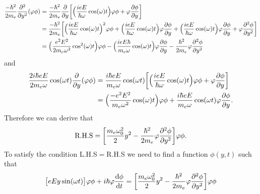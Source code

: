 \documentclass[a4paper]{article}
\numberwithin{equation}{subsection}
\numberwithin{equation}{section}
\begin{document}
\begin{equation} \label{1.25}
  \begin{aligned}
    \frac{-\hbar^2}{2m_e}\pdv[2]{y}(\varphi\phi) & =
    \frac{-\hbar^2}{2m_e} \pdv{y}\bigg[
      \Big(\frac{ieE}{\hbar \omega} \cos(\omega)t\Big)\varphi\phi +
      \varphi\pdv{\phi}{y}
    \bigg] \\
    & =
    \frac{-\hbar^2}{2m_e} \bigg[
      \Big(\frac{ieE}{\hbar \omega} \cos(\omega)t\Big)^2\varphi\phi +
      \Big(\frac{ieE}{\hbar \omega} \cos(\omega)t\Big)\varphi\pdv{\phi}{y} +
      \Big(\frac{ieE}{\hbar \omega} \cos(\omega)t\Big)\varphi\pdv{\phi}{y} +
      \varphi\pdv[2]{\phi}{y}
    \bigg] \\
    & =
    \Big(\frac{e^2E^2}{ 2m_e\omega^2} \cos[2](\omega)t\Big)\varphi\phi -
    \Big(\frac{ieE \hbar}{m_e\omega} \cos(\omega)t\Big)\varphi\pdv{\phi}{y} -
    \frac{\hbar^2}{2m_e}
    \varphi\pdv[2]{\phi}{y}
  \end{aligned}
\end{equation}
and
\begin{equation} \label{1.26}
  \begin{aligned}
    \frac{2i\hbar eE}{2m_e\omega}\cos(\omega t) \pdv{y} (\varphi\phi)& =
    \frac{i\hbar eE}{m_e\omega}\cos(\omega t)
    \bigg[
      \Big(\frac{ieE}{\hbar \omega} \cos(\omega)t\Big)\varphi\phi +
      \varphi\pdv{\phi}{y}
    \bigg] \\
    & =
    \Big(\frac{-e^2E^2}{m_e\omega^2} \cos(\omega)t\Big)\varphi\phi +
    \frac{i\hbar eE}{m_e\omega}\cos(\omega t)\varphi\pdv{\phi}{y}.
  \end{aligned}
\end{equation}
Therefore we can derive that
\begin{equation} \label{1.27}
  \begin{aligned}
    \text{R.H.S} =
    \bigg[
    \frac{m_e \omega_0^2}{2}y^2
    -
    \frac{\hbar^2}{2m_e}
    \varphi\pdv[2]{\phi}{y} \bigg]
    \varphi\phi.
  \end{aligned}
\end{equation}
To satisfy the condition L.H.S$=$R.H.S we need to find a function $\phi(y,t)$ such that
\begin{equation} \label{1.28}
  \begin{aligned}
    \big[{eEy}\sin(\omega t)\big]\varphi\phi +
    i \hbar\varphi  \dv{\phi}{t}
    =
    \bigg[
    \frac{m_e \omega_0^2}{2}y^2
    -
    \frac{\hbar^2}{2m_e}
    \varphi\pdv[2]{\phi}{y} \bigg]
    \varphi\phi
  \end{aligned}
\end{equation}
\end{document}
